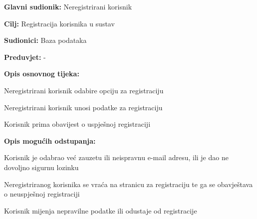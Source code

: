 					\noindent {}
					\begin{packed_item}
	
						\item \textbf{Glavni sudionik:} Neregistrirani korisnik
						\item  \textbf{Cilj:} Registracija korisnika u sustav
						\item  \textbf{Sudionici:} Baza podataka
						\item  \textbf{Preduvjet:} -
						\item  \textbf{Opis osnovnog tijeka:}
						\item[] \begin{packed_enum}
	
							\item Neregistrirani korisnik odabire opciju za registraciju
							\item Neregistrirani korisnik unosi podatke za registraciju
							\item Korisnik prima obavijest o uspješnoj registraciji
							
						\end{packed_enum}
						
						\item  \textbf{Opis mogućih odstupanja:}
						\item[] \begin{packed_item}
	
							\item[2.a] Korisnik je odabrao već zauzetu ili neispravnu e-mail adresu, ili je dao ne dovoljno sigurnu lozinku
							\item[] \begin{packed_enum}
								
								\item Neregistriranog korisnika se vraća na stranicu za registraciju te ga se obavještava o neuspješnoj registraciji
								\item Korisnik mijenja nepravilne podatke ili odustaje od registracije	
							\end{packed_enum}
						\end{packed_item}
					\end{packed_item}
					
